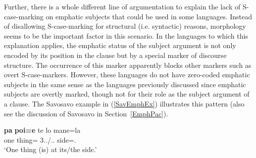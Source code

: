 Further, there is a whole different line of argumentation to explain the lack of S-case-marking on emphatic subjects that could be used in some languages. 
Instead of disallowing S-case-marking for structural (i.e. syntactic) reasons, morphology seems to be the important factor in this scenario. 
In the languages to which this explanation applies, the emphatic status of the subject argument is not only encoded by its position in the clause but by a special marker of discourse structure. 
The occurrence of this marker apparently blocks other markers such as overt S-case-markers. 
However, these languages do not have zero-coded emphatic subjects in the same sense as the languages previously discussed since emphatic subjects are overtly marked, though not for their role as the subject argument of a clause.
The Savosavo example in (\ref{SavEmphEx}) illustrates this pattern (also see the discussion of Savosavo in Section~\ref{EmphPac}).

\begin{exe}\ex\label{SavEmphEx}
\gll \textbf{pa} \textbf{poi=e} te lo mane=la\\
one thing=\emphat{} \emphat{} 3\sg{}.\mas{}.\gen{}/\deter{}.\sg{}.\mas{} side=\loc{}.\mas{}\\ 
\glt `One thing (is) at its/the side.'
\end{exe}
 




